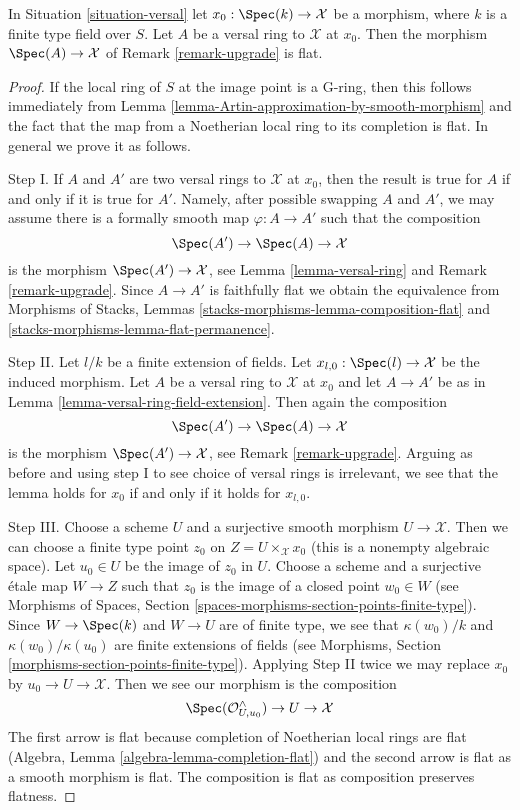 \begin{lemma}
\label{lemma-versal-ring-flat}
In Situation \ref{situation-versal} let $x_0 : \Spec(k) \to \mathcal{X}$
be a morphism, where $k$ is a finite type field over $S$.
Let $A$ be a versal ring to $\mathcal{X}$ at $x_0$.
Then the morphism $\Spec(A) \to \mathcal{X}$ of
Remark \ref{remark-upgrade} is flat.
\end{lemma}

\begin{proof}
If the local ring of $S$ at the image point is a G-ring, then this
follows immediately from
Lemma \ref{lemma-Artin-approximation-by-smooth-morphism}
and the fact that the map from a Noetherian local ring to its
completion is flat. In general we prove it as follows.

\medskip\noindent
Step I. If $A$ and $A'$ are two versal rings to $\mathcal{X}$ at $x_0$,
then the result is true for $A$ if and only if it is true for $A'$.
Namely, after possible swapping $A$ and $A'$, we may assume there is
a formally smooth map $\varphi : A \to A'$ such that the composition
$$
\Spec(A') \to \Spec(A) \to \mathcal{X}
$$
is the morphism $\Spec(A') \to \mathcal{X}$, see
Lemma \ref{lemma-versal-ring} and
Remark \ref{remark-upgrade}.
Since $A \to A'$ is faithfully flat we obtain the equivalence from
Morphisms of Stacks, Lemmas \ref{stacks-morphisms-lemma-composition-flat} and
\ref{stacks-morphisms-lemma-flat-permanence}.

\medskip\noindent
Step II. Let $l/k$ be a finite extension of fields. Let
$x_{l, 0} : \Spec(l) \to \mathcal{X}$ be the induced morphism.
Let $A$ be a versal ring to $\mathcal{X}$ at $x_0$ and
let $A \to A'$ be as in Lemma \ref{lemma-versal-ring-field-extension}.
Then again the composition
$$
\Spec(A') \to \Spec(A) \to \mathcal{X}
$$
is the morphism $\Spec(A') \to \mathcal{X}$, see Remark \ref{remark-upgrade}.
Arguing as before and using step I to see choice of versal rings
is irrelevant, we see that the lemma holds for $x_0$ if and only
if it holds for $x_{l, 0}$.

\medskip\noindent
Step III. Choose a scheme $U$ and a surjective smooth morphism
$U \to \mathcal{X}$. Then we can choose a finite type point
$z_0$ on $Z = U \times_\mathcal{X} x_0$ (this is a nonempty
algebraic space). Let $u_0 \in U$ be the image of $z_0$ in $U$.
Choose a scheme and a surjective \'etale map $W \to Z$
such that $z_0$ is the image of a closed point $w_0 \in W$
(see Morphisms of Spaces, Section
\ref{spaces-morphisms-section-points-finite-type}).
Since $W \to \Spec(k)$ and $W \to U$ are of finite type,
we see that $\kappa(w_0)/k$ and $\kappa(w_0)/\kappa(u_0)$
are finite extensions of fields
(see Morphisms, Section \ref{morphisms-section-points-finite-type}).
Applying Step II twice we may replace $x_0$ by
$u_0 \to U \to \mathcal{X}$. Then we see our morphism is the composition
$$
\Spec(\mathcal{O}_{U, u_0}^\wedge) \to U \to \mathcal{X}
$$
The first arrow is flat because completion of Noetherian local rings
are flat (Algebra, Lemma \ref{algebra-lemma-completion-flat})
and the second arrow is flat as
a smooth morphism is flat. The composition is flat as composition
preserves flatness.
\end{proof}


